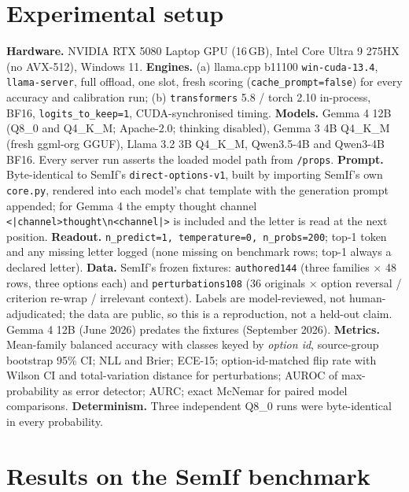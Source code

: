 \documentclass[11pt,a4paper]{article}
\newcommand{\code}[1]{\texttt{#1}}
\begin{document}
\section{Experimental setup}
\label{sec:setup}

\textbf{Hardware.} NVIDIA RTX 5080 Laptop GPU (16\,GB), Intel Core Ultra 9 275HX (no AVX-512), Windows 11.\quad
\textbf{Engines.} (a) llama.cpp b11100 \code{win-cuda-13.4}, \code{llama-server}, full offload, one slot, fresh scoring (\code{cache\_prompt=false}) for every accuracy and calibration run; (b) \code{transformers} 5.8 / torch 2.10 in-process, BF16, \code{logits\_to\_keep=1}, CUDA-synchronised timing.\quad
\textbf{Models.} Gemma 4 12B (Q8\_0 and Q4\_K\_M; Apache-2.0; thinking disabled), Gemma 3 4B Q4\_K\_M (fresh ggml-org GGUF), Llama 3.2 3B Q4\_K\_M, Qwen3.5-4B and Qwen3-4B BF16. Every server run asserts the loaded model path from \code{/props}.\quad
\textbf{Prompt.} Byte-identical to SemIf's \code{direct-options-v1}, built by importing SemIf's own \code{core.py}, rendered into each model's chat template with the generation prompt appended; for Gemma 4 the empty thought channel \code{<|channel>thought\textbackslash n<channel|>} is included and the letter is read at the next position.\quad
\textbf{Readout.} \code{n\_predict=1, temperature=0, n\_probs=200}; top-1 token and any missing letter logged (none missing on benchmark rows; top-1 always a declared letter).\quad
\textbf{Data.} SemIf's frozen fixtures: \code{authored144} (three families $\times$ 48 rows, three options each) and \code{perturbations108} (36 originals $\times$ option reversal / criterion re-wrap / irrelevant context). Labels are model-reviewed, not human-adjudicated; the data are public, so this is a reproduction, not a held-out claim. Gemma 4 12B (June 2026) predates the fixtures (September 2026).\quad
\textbf{Metrics.} Mean-family balanced accuracy with classes keyed by \emph{option id}, source-group bootstrap 95\% CI; NLL and Brier; ECE-15; option-id-matched flip rate with Wilson CI and total-variation distance for perturbations; AUROC of max-probability as error detector; AURC; exact McNemar for paired model comparisons.\quad
\textbf{Determinism.} Three independent Q8\_0 runs were byte-identical in every probability.

\section{Results on the SemIf benchmark}
\label{sec:experiments}
\end{document}
